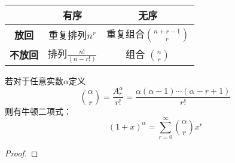 \begin{table}[h]
  \centering
  \begin{tabular}{|c|c|c|}
    \hline
                     & \bfseries 有序            & \bfseries 无序                 \\ \hline
    \bfseries 放回   & 重复排列$n^r$             & 重复组合$\binom{n + r - 1}{r}$ \\ \hline
    \bfseries 不放回 & 排列$\frac{n!}{(n - r!)}$ & 组合 $\binom{n}{r}$            \\ \hline
  \end{tabular}
\end{table}

\begin{theorem}[牛顿二项式定理]\label{No}
  若对于任意实数$\alpha$定义
  \[ \binom{\alpha}{r}=\frac{A^{\alpha}_{r}}{r!}=\frac{\alpha(\alpha-1)\cdots (\alpha-r+1)}{r!} \]
  则有牛顿二项式：
  \[ (1+x)^{\alpha}=\sum_{r=0}^{\infty}\binom{\alpha}{r}x^r \]
\end{theorem}

\begin{proof}
\end{proof}